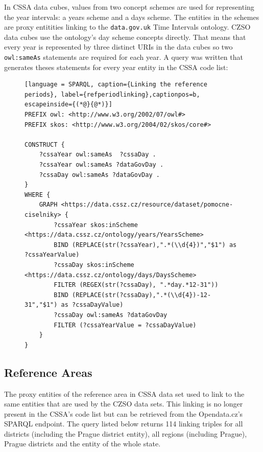 In CSSA data cubes, values from two concept schemes are used for representing the year intervals: a years scheme and a days scheme. The entities in the schemes are proxy entitities linking to the \verb|data.gov.uk| Time Intervals ontology. CZSO data cubes use the ontology's day scheme concepts directly. That means that every year is represented by three distinct URIs in the data cubes so two \verb|owl:sameAs| statements are required for each year. A query was written that generates theses statements for every year entity in the CSSA code list:

\begin{figure}[h]
\begin{lstlisting}[language = SPARQL, caption={Linking the reference periods}, label={refperiodlinking},captionpos=b, escapeinside={(*@}{@*)}]
PREFIX owl: <http://www.w3.org/2002/07/owl#>
PREFIX skos: <http://www.w3.org/2004/02/skos/core#>
    
CONSTRUCT {
    ?cssaYear owl:sameAs  ?cssaDay .
    ?cssaYear owl:sameAs ?dataGovDay .
    ?cssaDay owl:sameAs ?dataGovDay .
}  
WHERE {
    GRAPH <https://data.cssz.cz/resource/dataset/pomocne-ciselniky> {
        ?cssaYear skos:inScheme <https://data.cssz.cz/ontology/years/YearsScheme>
        BIND (REPLACE(str(?cssaYear),".*(\\d{4})","$1") as ?cssaYearValue)
        ?cssaDay skos:inScheme <https://data.cssz.cz/ontology/days/DaysScheme>
        FILTER (REGEX(str(?cssaDay), ".*day.*12-31"))
        BIND (REPLACE(str(?cssaDay),".*(\\d{4})-12-31","$1") as ?cssaDayValue)
        ?cssaDay owl:sameAs ?dataGovDay
        FILTER (?cssaYearValue = ?cssaDayValue)
    }
}
\end{lstlisting}
\end{figure}

\subsection{Reference Areas}

The proxy entities of the reference area in CSSA data set used to link to the same entities that are used by the CZSO data sets. This linking is no longer present in the CSSA's code list but can be retrieved from the Opendata.cz's SPARQL endpoint. The query listed below returns 114 linking triples for all districts (including the Prague district entity), all regions (including Prague), Prague districts and the entity of the whole state.

